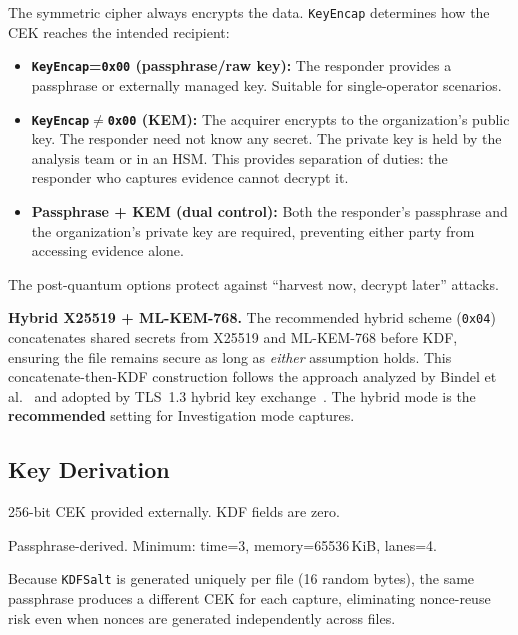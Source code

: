 \documentclass[11pt,a4paper]{article}
\newcommand{\hex}[1]{\texttt{0x#1}}
\newcommand{\field}[1]{\texttt{#1}}
\begin{document}
\begin{notebox}[title={Operational model: symmetric key vs.\ KEM}]
The symmetric cipher always encrypts the data. \field{KeyEncap} determines how the CEK reaches the intended recipient:
\begin{itemize}[leftmargin=1.5em, itemsep=2pt]
\item \textbf{\field{KeyEncap}=\hex{00} (passphrase/raw key):} The responder provides a passphrase or externally managed key. Suitable for single-operator scenarios.
\item \textbf{\field{KeyEncap}$\neq$\hex{00} (KEM):} The acquirer encrypts to the organization's public key. The responder need not know any secret. The private key is held by the analysis team or in an HSM. This provides separation of duties: the responder who captures evidence cannot decrypt it.
\item \textbf{Passphrase + KEM (dual control):} Both the responder's passphrase and the organization's private key are required, preventing either party from accessing evidence alone.
\end{itemize}
\noindent The post-quantum options protect against ``harvest now, decrypt later'' attacks.
\end{notebox}

\noindent\textbf{Hybrid X25519 + ML-KEM-768.} The recommended hybrid scheme (\hex{04}) concatenates shared secrets from X25519 and ML-KEM-768 before KDF, ensuring the file remains secure as long as \emph{either} assumption holds. This concatenate-then-KDF construction follows the approach analyzed by Bindel et al.~\cite{bindel2019} and adopted by TLS~1.3 hybrid key exchange~\cite{ietfhybrid}. The hybrid mode is the \textbf{recommended} setting for Investigation mode captures.

\subsection{Key Derivation}
\begin{description}[style=nextline, leftmargin=2em, itemsep=3pt]
\item[\hex{00} --- None] 256-bit CEK provided externally. KDF fields are zero.
\item[\hex{01} --- Argon2id] Passphrase-derived. Minimum: time=3, memory=65536\,KiB, lanes=4.
\end{description}

\noindent Because \field{KDFSalt} is generated uniquely per file (16 random bytes), the same passphrase produces a different CEK for each capture, eliminating nonce-reuse risk even when nonces are generated independently across files.
\end{document}

